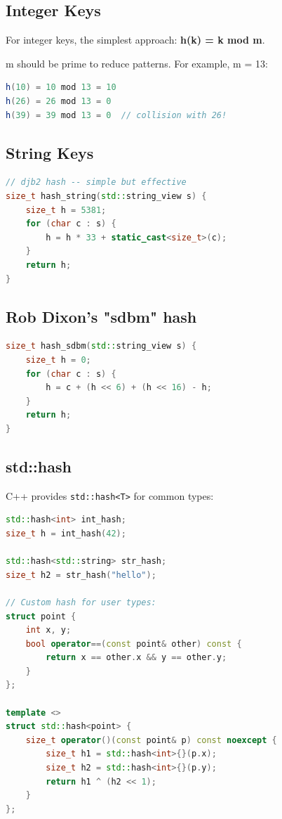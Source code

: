 \subsection{Integer Keys}

For integer keys, the simplest approach: \textbf{h(k) = k mod m}.

m should be prime to reduce patterns. For example, m = 13:
\begin{lstlisting}[language=Java]
h(10) = 10 mod 13 = 10
h(26) = 26 mod 13 = 0
h(39) = 39 mod 13 = 0  // collision with 26!
\end{lstlisting}

\subsection{String Keys}

\begin{lstlisting}[language=C++]
// djb2 hash -- simple but effective
size_t hash_string(std::string_view s) {
    size_t h = 5381;
    for (char c : s) {
        h = h * 33 + static_cast<size_t>(c);
    }
    return h;
}
\end{lstlisting}

\subsection{Rob Dixon's "sdbm" hash}

\begin{lstlisting}[language=C++]
size_t hash_sdbm(std::string_view s) {
    size_t h = 0;
    for (char c : s) {
        h = c + (h << 6) + (h << 16) - h;
    }
    return h;
}
\end{lstlisting}

\subsection{std::hash}

C++ provides \texttt{std::hash<T>} for common types:

\begin{lstlisting}[language=C++]
std::hash<int> int_hash;
size_t h = int_hash(42);

std::hash<std::string> str_hash;
size_t h2 = str_hash("hello");

// Custom hash for user types:
struct point {
    int x, y;
    bool operator==(const point& other) const {
        return x == other.x && y == other.y;
    }
};

template <>
struct std::hash<point> {
    size_t operator()(const point& p) const noexcept {
        size_t h1 = std::hash<int>{}(p.x);
        size_t h2 = std::hash<int>{}(p.y);
        return h1 ^ (h2 << 1);
    }
};
\end{lstlisting}

